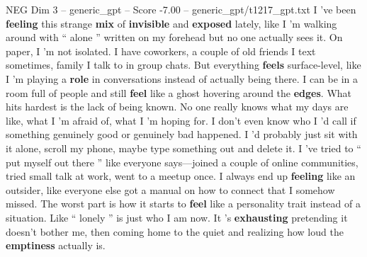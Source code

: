 \begin{textsample}{NEG Dim 3 – generic\_gpt – Score -7.00 – generic\_gpt/t1217\_gpt.txt}  \label{ex:f3_neg_001}
I ’ve been \textbf{feeling} this strange \textbf{mix} of \textbf{invisible} and \textbf{exposed} lately, like I ’m walking around with “ alone ” written on my forehead but no one actually sees it.
On paper, I ’m not isolated.
I have coworkers, a couple of old friends I text sometimes, family I talk to in group chats.
But everything \textbf{feels} surface-level, like I ’m playing a \textbf{role} in conversations instead of actually being there.
I can be in a room full of people and still \textbf{feel} like a ghost hovering around the \textbf{edges}.
What hits hardest is the lack of being known.
No one really knows what my days are like, what I ’m afraid of, what I ’m hoping for.
I don't even know who I ’d call if something genuinely good or genuinely bad happened.
I ’d probably just sit with it alone, scroll my phone, maybe type something out and delete it.
I ’ve tried to “ put myself out there ” like everyone says—joined a couple of online communities, tried small talk at work, went to a meetup once.
I always end up \textbf{feeling} like an outsider, like everyone else got a manual on how to connect that I somehow missed.
The worst part is how it starts to \textbf{feel} like a personality trait instead of a situation.
Like “ lonely ” is just who I am now.
It ’s \textbf{exhausting} pretending it doesn't bother me, then coming home to the quiet and realizing how loud the \textbf{emptiness} actually is.

\end{textsample}
